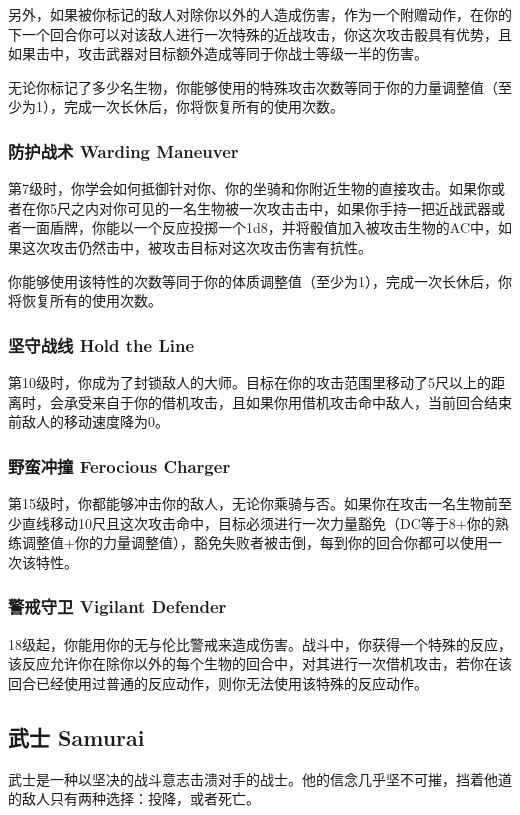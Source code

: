 另外，如果被你标记的敌人对除你以外的人造成伤害，作为一个附赠动作，在你的下一个回合你可以对该敌人进行一次特殊的近战攻击，你这次攻击骰具有优势，且如果击中，攻击武器对目标额外造成等同于你战士等级一半的伤害。

无论你标记了多少名生物，你能够使用的特殊攻击次数等同于你的力量调整值（至少为1），完成一次长休后，你将恢复所有的使用次数。

\subsubsection{防护战术 Warding Maneuver}第7级时，你学会如何抵御针对你、你的坐骑和你附近生物的直接攻击。如果你或者在你5尺之内对你可见的一名生物被一次攻击击中，如果你手持一把近战武器或者一面盾牌，你能以一个反应投掷一个1d8，并将骰值加入被攻击生物的AC中，如果这次攻击仍然击中，被攻击目标对这次攻击伤害有抗性。

你能够使用该特性的次数等同于你的体质调整值（至少为1），完成一次长休后，你将恢复所有的使用次数。

\subsubsection{坚守战线 Hold the Line}第10级时，你成为了封锁敌人的大师。目标在你的攻击范围里移动了5尺以上的距离时，会承受来自于你的借机攻击，且如果你用借机攻击命中敌人，当前回合结束前敌人的移动速度降为0。

\subsubsection{野蛮冲撞 Ferocious Charger}第15级时，你都能够冲击你的敌人，无论你乘骑与否。如果你在攻击一名生物前至少直线移动10尺且这次攻击命中，目标必须进行一次力量豁免（DC等于8+你的熟练调整值+你的力量调整值），豁免失败者被击倒，每到你的回合你都可以使用一次该特性。

\subsubsection{警戒守卫 Vigilant Defender}18级起，你能用你的无与伦比警戒来造成伤害。战斗中，你获得一个特殊的反应，该反应允许你在除你以外的每个生物的回合中，对其进行一次借机攻击，若你在该回合已经使用过普通的反应动作，则你无法使用该特殊的反应动作。

\subsection{武士 Samurai}
武士是一种以坚决的战斗意志击溃对手的战士。他的信念几乎坚不可摧，挡着他道的敌人只有两种选择：投降，或者死亡。

